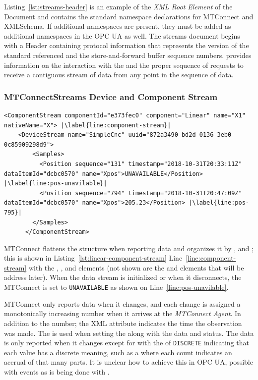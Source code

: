 Listing~\ref{lst:streams-header} is an example of the \textit{XML Root Element} of the  Document and contains the standard namespace declarations for MTConnect and XMLSchema. If additional namespaces are present, they must be added as additional namespaces in the OPC UA  as well. The streams document begins with a Header containing protocol information that represents the version of the standard referenced and the store-and-forward buffer sequence numbers. \cite{MTCPart1} provides information on the interaction with the  and the proper sequence of requests to receive a contiguous stream of data from any point in the sequence of data.

\subsubsection{MTConnectStreams Device and Component Stream}

\begin{lstlisting}[firstnumber=last,escapechar=|,%
    caption={Component Stream},label={lst:component-stream}]
      <ComponentStream componentId="e373fec0" component="Linear" name="X1" nativeName="X"> |\label{line:component-stream}|
    <DeviceStream name="SimpleCnc" uuid="872a3490-bd2d-0136-3eb0-0c85909298d9">    
        <Samples>
          <Position sequence="131" timestamp="2018-10-31T20:33:11Z" dataItemId="dcbc0570" name="Xpos">UNAVAILABLE</Position> |\label{line:pos-unavilable}|
          <Position sequence="794" timestamp="2018-10-31T20:47:09Z" dataItemId="dcbc0570" name="Xpos">205.23</Position> |\label{line:pos-795}|
        </Samples>
      </ComponentStream>
\end{lstlisting}

MTConnect flattens the structure when reporting data and organizes it by ,  and ; this is shown in  Listing~\ref{lst:linear-component-stream} Line~\ref{line:component-stream} with the , , and  elements (not shown are the  and  elements that will be address later). When the data stream is initialized or when it disconnects, the MTConnect  is set to \texttt{UNAVAILABLE} as shown on Line~\ref{line:pos-unavilable}.

MTConnect only reports data when it changes, and each change is assigned a monotonically increasing  number when it arrives at the \textit{MTConnect Agent}. In addition to the  number; the XML attribute  indicates the time the observation was made. The  is used when setting the   along with the data and status. The data is only reported when it changes except for  with the  of \texttt{DISCRETE} indicating that each value has a discrete meaning, such as a  where each count indicates an accrual of that many parts. {\color{red} It is unclear how to achieve this in OPC UA, possible with events as is being done with }.

